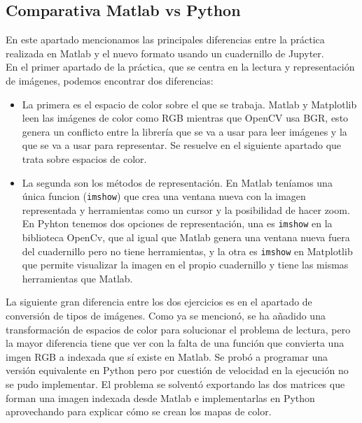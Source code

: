 \subsection{Comparativa Matlab vs Python}

En este apartado mencionamos las principales diferencias entre la práctica realizada en Matlab y el nuevo formato usando un cuadernillo de Jupyter.\\

En el primer apartado de la práctica, que se centra en la lectura y representación de imágenes, podemos encontrar dos diferencias:\\

\begin{itemize}
\item La primera es el espacio de color sobre el que se trabaja. Matlab y Matplotlib leen las imágenes de color como RGB mientras que OpenCV usa BGR, esto genera un conflicto entre la librería que se va a usar para leer imágenes y la que se va a usar para representar. Se resuelve en el siguiente apartado que trata sobre espacios de color.\\

\item La segunda son los métodos de representación. En Matlab teníamos una única funcion (\texttt{imshow}) que crea una ventana nueva con la imagen representada y herramientas como un cursor y la posibilidad de hacer zoom. En Pyhton tenemos dos opciones de representación, una es \texttt{imshow} en la biblioteca  OpenCv, que al igual que Matlab genera una ventana nueva fuera del cuadernillo pero no tiene herramientas, y la otra es \texttt{imshow} en Matplotlib que permite visualizar la imagen en el propio cuadernillo y tiene las mismas herramientas que Matlab.\\
\end{itemize}

La siguiente gran diferencia entre los dos ejercicios es en el apartado de conversión de tipos de imágenes. Como ya se mencionó, se ha añadido una transformación de espacios de color para solucionar el problema de lectura, pero la mayor diferencia tiene que ver con la falta de una función que convierta una imgen RGB a indexada que sí existe en Matlab. Se probó a programar una versión equivalente en Python pero por cuestión de velocidad en la ejecución no se pudo implementar. El problema se solventó exportando las dos matrices que forman una imagen indexada desde Matlab  e implementarlas en Python aprovechando para explicar cómo se crean los mapas de color.\\

